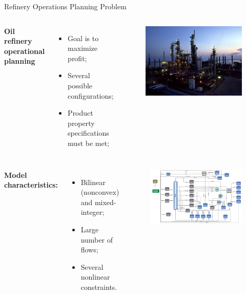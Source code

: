 \begin{frame}{Refinery Operations Planning Problem}

	\begin{columns}
		{\bf Oil refinery operational planning}
		\begin{itemize}
			\item Goal is to maximize profit;
			\item Several possible configurations;
			\item \alert{Product property specifications} must be met;
		   \end{itemize}
		
		\begin{figure}
			\includegraphics[width=\linewidth]{figures/Refinery.png}
		\end{figure}
	\end{columns}
	\pause
	\begin{columns}
		\column{0.6\textwidth}
		{\bf Model characteristics:}
			\begin{itemize}
				\item \alert{Bilinear (nonconvex) and mixed-integer};
				\item Large number of flows;
				\item Several nonlinear constraints.
		    \end{itemize}
		\column{0.4\textwidth}
		\begin{figure}
			\includegraphics[width=\linewidth]{figures/RefinerySchema.png}
		\end{figure}
	\end{columns}


\end{frame}
